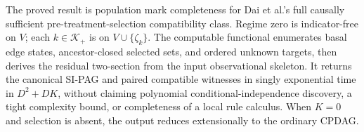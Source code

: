 The proved result is population mark completeness for Dai et al.'s full causally sufficient pre-treatment-selection compatibility class.  Regime zero is indicator-free on \(V\); each \(k\in\mathcal K_+\) is on \(V\cup\{\zeta_k\}\).  The computable functional enumerates basal edge states, ancestor-closed selected sets, and ordered unknown targets, then derives the residual two-section from the input observational skeleton.  It returns the canonical SI-PAG and paired compatible witnesses in singly exponential time in \(D^2+DK\), without claiming polynomial conditional-independence discovery, a tight complexity bound, or completeness of a local rule calculus.  When \(K=0\) and selection is absent, the output reduces extensionally to the ordinary CPDAG.
